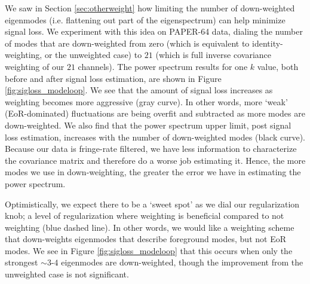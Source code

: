 \documentclass[preprint2,numberedappendix,tighten]{aastex6}  %
\begin{document}
We saw in Section \ref{sec:otherweight} how limiting the number of down-weighted eigenmodes (i.e. flattening out part of the 
eigenspectrum) can help minimize signal loss. We experiment with this idea on PAPER-64 data, dialing the number of modes 
that are down-weighted from zero (which is equivalent to identity-weighting, or the unweighted case) to $21$ (which is full inverse 
covariance weighting of our $21$ channels). The power spectrum results for one $k$ value, both before and after signal loss 
estimation, are shown in Figure \ref{fig:sigloss_modeloop}. We see that the amount of signal loss increases as weighting 
becomes more aggressive (gray curve). In other words, more `weak' (EoR-dominated) fluctuations are being overfit and 
subtracted as more modes are down-weighted. We also find that the power spectrum upper limit, post signal loss estimation, 
increases with the number of down-weighted modes (black curve). Because our data is fringe-rate filtered, we have less information to characterize the covariance matrix and therefore do a worse job estimating it. Hence, the more modes we use in down-weighting, the greater the error we have in estimating the power spectrum.

Optimistically, we expect there to be a `sweet spot' as we dial our regularization knob; a level of regularization where weighting 
is beneficial compared to not weighting (blue dashed line). In other words, we would like a weighting scheme that down-weights eigenmodes that describe foreground modes, but not EoR modes. We see in Figure \ref{fig:sigloss_modeloop} that this occurs when 
only the strongest $\sim3$-$4$ eigenmodes are down-weighted, though the improvement from the unweighted case is not 
significant. 
\end{document}
